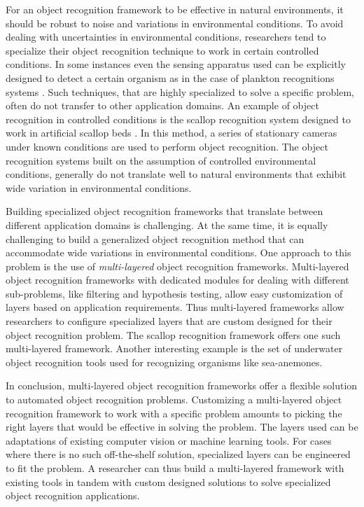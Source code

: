 For an object recognition framework to be effective in natural environments, it
should be robust to noise and variations in environmental conditions. 
To avoid dealing with uncertainties in environmental conditions, researchers tend to specialize their object recognition technique to work in certain controlled conditions. In some instances even the sensing apparatus used can be explicitly designed to detect a certain organism as in the case of plankton 
recognitions systems \cite{mcgavin_plankton, stelzer_rotifier}. 
Such techniques, that are highly specialized to solve a specific problem, 
often do not transfer to other application domains. An example of object recognition in controlled conditions is the scallop recognition system designed to work in artificial scallop beds \cite{enomoto9,enomoto10}. In this method, a series of stationary cameras under known conditions are used to perform object recognition. The object recognition systems built on the assumption of controlled environmental conditions, generally do not translate well to natural environments that exhibit wide variation in environmental conditions.

Building specialized object recognition frameworks that translate between different application domains is challenging. 
At the same time, it is equally challenging to build a generalized object recognition method that can accommodate wide variations in environmental conditions. 
One approach to this problem is the use of \emph{multi-layered} object recognition frameworks. Multi-layered object recognition frameworks with dedicated modules for dealing with different sub-problems, like filtering and hypothesis testing, allow easy customization of layers based on application requirements. 
Thus multi-layered frameworks allow researchers to configure specialized layers that are custom designed for their object recognition problem. The scallop
recognition framework \cite{prasanna_aslo, prasanna_igi} offers one such multi-layered framework. Another interesting example is the set of underwater object recognition tools \cite{schoening} used for recognizing organisms like sea-anemones.

In conclusion, multi-layered object recognition frameworks offer a flexible solution to automated object recognition problems. Customizing a multi-layered object recognition framework to work with a specific problem amounts to picking the right layers that would be effective in solving the problem. The layers used can be adaptations of existing computer vision or machine learning tools. For cases where there is no such off-the-shelf solution, specialized layers can be engineered to fit the problem. A researcher can thus build a multi-layered framework with existing tools in tandem with custom designed solutions to solve specialized object recognition applications.

